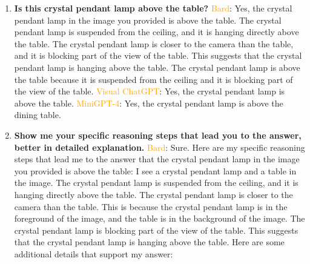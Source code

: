 \begin{enumerate}
    Do you have other questions or requests?
    \subitem \textcolor{orange}{Visual ChatGPT}: The crystal pendant lamp is hanging above the table.
    \subitem \textcolor{orange}{MiniGPT-4}: The crystal pendant lamp is hanging from the ceiling above the dining table. The table is made of wood and has six chairs around it. The room has white walls and a white floor. There is a window on the wall to the left of the table.
    \item \textbf{Is this crystal pendant lamp above the table?}
    \subitem \textcolor{orange}{Bard}: Yes, the crystal pendant lamp in the image you provided is above the table. The crystal pendant lamp is suspended from the ceiling, and it is hanging directly above the table. The crystal pendant lamp is closer to the camera than the table, and it is blocking part of the view of the table. This suggests that the crystal pendant lamp is hanging above the table. The crystal pendant lamp is above the table because it is suspended from the ceiling and it is blocking part of the view of the table.
    \subitem \textcolor{orange}{Visual ChatGPT}: Yes, the crystal pendant lamp is above the table.
    \subitem \textcolor{orange}{MiniGPT-4}: Yes, the crystal pendant lamp is above the dining table.
    \item \textbf{Show me your specific reasoning steps that lead you to the answer, better in detailed explanation.}
    \subitem \textcolor{orange}{Bard}: 
    Sure. Here are my specific reasoning steps that lead me to the answer that the crystal pendant lamp in the image you provided is above the table:
    I see a crystal pendant lamp and a table in the image.
    The crystal pendant lamp is suspended from the ceiling, and it is hanging directly above the table.
    The crystal pendant lamp is closer to the camera than the table. This is because the crystal pendant lamp is in the foreground of the image, and the table is in the background of the image.
    The crystal pendant lamp is blocking part of the view of the table. This suggests that the crystal pendant lamp is hanging above the table.
    Here are some additional details that support my answer:


\end{enumerate}
